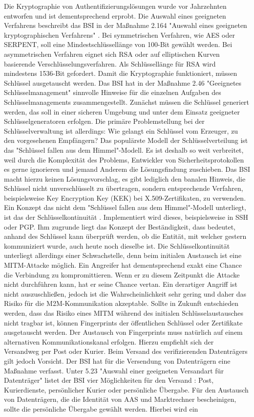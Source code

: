 \documentclass[11pt,a4paper]{report}
\begin{document}
Die Kryptographie von Authentifizierungslösungen wurde vor Jahrzehnten entworfen und ist dementsprechend erprobt. Die Auswahl eines geeigneten Verfahrens beschreibt das BSI in der Maßnahme 2.164 "Auswahl eines geeigneten kryptographischen Verfahrens" \cite{bsi_m2164}. Bei symmetrischen Verfahren, wie AES oder SERPENT, soll eine Mindestschlüssellänge von 100-Bit gewählt werden. Bei asymmetrischen Verfahren eignet sich RSA oder auf elliptischen Kurven basierende Verschlüsselungsverfahren. Als Schlüssellänge für RSA wird mindestens 1536-Bit gefordert. Damit die Kryptographie funktioniert, müssen Schlüssel ausgetauscht werden. Das BSI hat in der Maßnahme 2.46 "Geeignetes Schlüsselmanagement" sinnvolle Hinweise für die einzelnen Aufgaben des Schlüsselmanagements zusammengestellt. Zunächst müssen die Schlüssel generiert werden, das soll in einer sicheren Umgebung und unter dem Einsatz geeigneter Schlüsselgeneratoren erfolgen. Die primäre Problemstellung bei der Schlüsselverwaltung ist allerdings: Wie gelangt ein Schlüssel vom Erzeuger, zu den vorgesehenen Empfängern? Das populärste Modell der Schlüsselverteilung ist das "Schlüssel fallen aus dem Himmel"-Modell. Es ist deshalb so weit verbreitet, weil durch die Komplexität des Problems, Entwickler von Sicherheitsprotokollen es gerne ignorieren und jemand Anderem die Lösungsfindung zuschieben. Das BSI macht hierzu keinen Lösungsvorschlag, es gibt lediglich den banalen Hinweis, die Schlüssel nicht unverschlüsselt zu übertragen, sondern entsprechende Verfahren, beispielsweise Key Encryption Key (KEK) bei X.509-Zertifikaten, zu verwenden. Ein Konzept das nicht dem "Schlüssel fallen aus dem Himmel"-Modell unterliegt, ist das der Schlüsselkontinuität \cite{ietf_kcm}. Implementiert wird dieses, beispielsweise in SSH oder PGP. Ihm zugrunde liegt das Konzept der Beständigkeit, dass bedeutet, anhand des Schlüssel kann überprüft werden, ob die Entität, mit welcher gestern kommuniziert wurde, auch heute noch dieselbe ist. Die Schlüsselkontinuität unterliegt allerdings einer Schwachstelle, denn beim initialen Austausch ist eine MITM-Attacke möglich. Ein Angreifer hat dementsprechend exakt eine Chance die Verbindung zu kompromittieren. Wenn er zu diesem Zeitpunkt die Attacke nicht durchführen kann, hat er seine Chance vertan. Ein derartiger Angriff ist nicht auszuschließen, jedoch ist die Wahrscheinlichkeit sehr gering und daher das Risiko für die M2M-Kommunikation akzeptable. Sollte in Zukunft entschieden werden, dass das Risiko eines MITM während des initialen Schlüsselaustausches nicht tragbar ist, können Fingerprints der öffentlichen Schlüssel oder Zertifikate ausgetauscht werden. Der Austausch von Fingerprints muss natürlich auf einem alternativen Kommunikationskanal erfolgen. Hierzu empfiehlt sich der Versandweg per Post oder Kurier. Beim Versand des verifizierenden Datenträgers gilt jedoch Vorsicht. Der BSI hat für die Versendung von Datenträgern eine Maßnahme verfasst. Unter 5.23 "Auswahl einer geeigneten Versandart für Datenträger" listet der BSI vier Möglichkeiten für den Versand \cite{bsi_m5023}: Post, Kurierdienste, persönlicher Kurier oder persönliche Übergabe. Für den Austausch von Datenträgern, die die Identität von AAS und Marktrechner bescheinigen, sollte die persönliche Übergabe gewählt werden. Hierbei wird ein 
\end{document}

